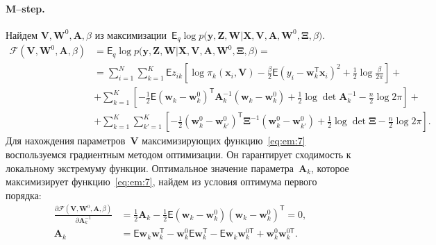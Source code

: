 \documentclass[12pt, twoside]{article}
\numberwithin{equation}{section}
\begin{document}
\paragraph{M--step.} Найдем $\mathbf{V}, \mathbf{W}^0, \textbf{A},  \beta$ из максимизации~$\mathsf{E}_{q}\log p\bigr(\mathbf{y}, \mathbf{Z}, \mathbf{W}|\mathbf{X}, \mathbf{V}, \textbf{A}, \textbf{W}^{0}, \bm{\Xi}, \beta\bigr)$.
\begin{equation}
\label{eq:em:7}
\begin{aligned}
\mathcal{F}\left(\textbf{V}, \textbf{W}^{0}, \textbf{A}, \beta\right) &= \mathsf{E}_{q}\log p\bigr(\mathbf{y}, \mathbf{Z}, \mathbf{W}|\mathbf{X}, \mathbf{V}, \textbf{A}, \textbf{W}^{0}, \bm{\Xi}, \beta\bigr) =  \\
&= \sum_{i=1}^{N}\sum_{k=1}^{K}\mathsf{E}z_{ik}\left[\log\pi_k\left(\textbf{x}_i, \textbf{V}\right) - \frac{\beta}{2}\mathsf{E}\left(y_{i} - \textbf{w}_{k}^{\mathsf{T}}\textbf{x}_{i}\right)^{2} + \frac{1}{2}\log\frac{\beta}{2\pi}\right] +\\
&+ \sum_{k=1}^{K}\left[-\frac{1}{2}\mathsf{E}\left(\textbf{w}_{k} - \textbf{w}_{k}^{0}\right)^{\mathsf{T}}\textbf{A}_{k}^{-1}\left(\textbf{w}_{k} - \textbf{w}_{k}^{0}\right) + \frac{1}{2}\log\det\textbf{A}^{-1}_{k} - \frac{n}{2}\log2\pi\right] +\\
&+ \sum_{k=1}^{K}\sum_{k'=1}^{K}\left[-\frac{1}{2}\left(\textbf{w}_{k}^{0}-\textbf{w}_{k'}^{0}\right)^{\mathsf{T}}\bm{\Xi}^{-1}\left(\textbf{w}_{k}^{0}-\textbf{w}_{k'}^{0}\right) +\frac{1}{2}\log\det\bm{\Xi} -\frac{n}{2}\log{2\pi}\right].
\end{aligned}
\end{equation}
Для нахождения параметров~$\textbf{V}$ максимизирующих функцию~\eqref{eq:em:7} воспользуемся градиентным методом оптимизации. Он гарантирует сходимость к локальному экстремуму функции.
Оптимальное значение параметра~$\textbf{A}_k$, которое максимизирует функцию~\eqref{eq:em:7}, найдем из условия оптимума первого порядка:
\begin{equation}
\label{eq:em:9}
\begin{aligned}
\frac{\partial \mathcal{F}\left(\textbf{V}, \textbf{W}^{0}, \textbf{A}, \beta\right)}{\partial \textbf{A}^{-1}_k} &=  \frac{1}{2}\textbf{A}_{k} - \frac{1}{2}\mathsf{E}\left(\textbf{w}_{k} - \textbf{w}_{k}^{0}\right)\left(\textbf{w}_{k} - \textbf{w}_{k}^{0}\right)^{\mathsf{T}} = 0,\\
\textbf{A}_{k} &= \mathsf{E}\textbf{w}_{k}\textbf{w}_{k}^{\mathsf{T}} - \textbf{w}_{k}^{0}\mathsf{E}\textbf{w}_{k}^{\mathsf{T}} - \mathsf{E}\textbf{w}_{k}\textbf{w}_{k}^{0\mathsf{T}} + \textbf{w}_{k}^{0}\textbf{w}_{k}^{0\mathsf{T}}.
\end{aligned}
\end{equation}
\end{document}
